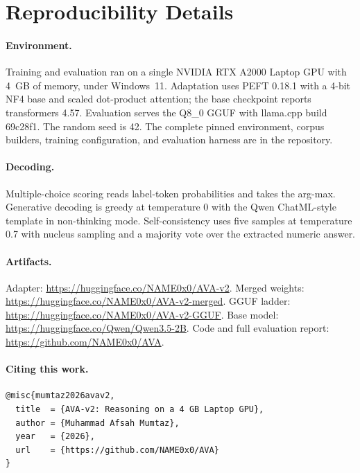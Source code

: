\section{Reproducibility Details}
\label{sec:repro}

\paragraph{Environment.}
Training and evaluation ran on a single NVIDIA RTX A2000 Laptop GPU with 4~GB of memory, under Windows~11. Adaptation uses PEFT 0.18.1 with a 4-bit NF4 base and scaled dot-product attention; the base checkpoint reports transformers 4.57. Evaluation serves the Q8\_0 GGUF with llama.cpp build 69c28f1. The random seed is 42. The complete pinned environment, corpus builders, training configuration, and evaluation harness are in the repository.

\paragraph{Decoding.}
Multiple-choice scoring reads label-token probabilities and takes the arg-max. Generative decoding is greedy at temperature 0 with the Qwen ChatML-style template in non-thinking mode. Self-consistency uses five samples at temperature 0.7 with nucleus sampling and a majority vote over the extracted numeric answer.

\paragraph{Artifacts.}
{\raggedright
Adapter: \url{https://huggingface.co/NAME0x0/AVA-v2}.
Merged weights: \url{https://huggingface.co/NAME0x0/AVA-v2-merged}.
GGUF ladder: \url{https://huggingface.co/NAME0x0/AVA-v2-GGUF}.
Base model: \url{https://huggingface.co/Qwen/Qwen3.5-2B}.
Code and full evaluation report: \url{https://github.com/NAME0x0/AVA}.
\par}

\medskip

\paragraph{Citing this work.}
{\footnotesize
\begin{verbatim}
@misc{mumtaz2026avav2,
  title  = {AVA-v2: Reasoning on a 4 GB Laptop GPU},
  author = {Muhammad Afsah Mumtaz},
  year   = {2026},
  url    = {https://github.com/NAME0x0/AVA}
}
\end{verbatim}
}
